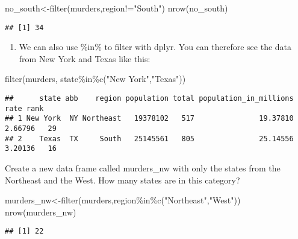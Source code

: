 \documentclass[
]{article}
\newenvironment{Shaded}{\begin{snugshade}}{\end{snugshade}}
\newcommand{\FunctionTok}[1]{\textcolor[rgb]{0.00,0.00,0.00}{#1}}
\newcommand{\NormalTok}[1]{#1}
\newcommand{\OtherTok}[1]{\textcolor[rgb]{0.56,0.35,0.01}{#1}}
\newcommand{\SpecialCharTok}[1]{\textcolor[rgb]{0.00,0.00,0.00}{#1}}
\newcommand{\StringTok}[1]{\textcolor[rgb]{0.31,0.60,0.02}{#1}}
\providecommand{\tightlist}{%
  \setlength{\itemsep}{0pt}\setlength{\parskip}{0pt}}
\begin{document}
\begin{Shaded}
\begin{Highlighting}[]
\NormalTok{no\_south}\OtherTok{\textless{}{-}}\FunctionTok{filter}\NormalTok{(murders,region}\SpecialCharTok{!=}\StringTok{"South"}\NormalTok{)}
\FunctionTok{nrow}\NormalTok{(no\_south)}
\end{Highlighting}
\end{Shaded}

\begin{verbatim}
## [1] 34
\end{verbatim}

\begin{enumerate}
\def\labelenumi{\arabic{enumi}.}
\setcounter{enumi}{5}
\tightlist
\item
  We can also use \%in\% to filter with dplyr. You can therefore see the
  data from New York and Texas like this:
\end{enumerate}

\begin{Shaded}
\begin{Highlighting}[]
\FunctionTok{filter}\NormalTok{(murders, state}\SpecialCharTok{\%in\%}\FunctionTok{c}\NormalTok{(}\StringTok{"New York"}\NormalTok{,}\StringTok{"Texas"}\NormalTok{))}
\end{Highlighting}
\end{Shaded}

\begin{verbatim}
##      state abb    region population total population_in_millions    rate rank
## 1 New York  NY Northeast   19378102   517               19.37810 2.66796   29
## 2    Texas  TX     South   25145561   805               25.14556 3.20136   16
\end{verbatim}

Create a new data frame called murders\_nw with only the states from the
Northeast and the West. How many states are in this category?

\begin{Shaded}
\begin{Highlighting}[]
\NormalTok{murders\_nw}\OtherTok{\textless{}{-}}\FunctionTok{filter}\NormalTok{(murders,region}\SpecialCharTok{\%in\%}\FunctionTok{c}\NormalTok{(}\StringTok{"Northeast"}\NormalTok{,}\StringTok{"West"}\NormalTok{))}
\FunctionTok{nrow}\NormalTok{(murders\_nw)}
\end{Highlighting}
\end{Shaded}

\begin{verbatim}
## [1] 22
\end{verbatim}
\end{document}
